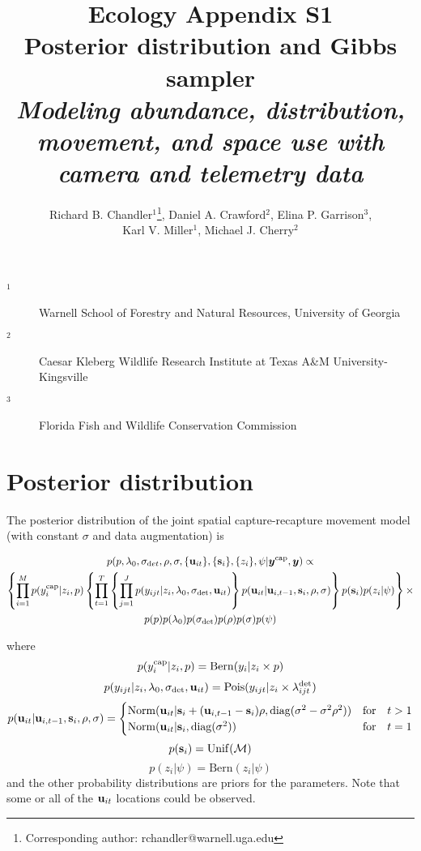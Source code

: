 \documentclass[12pt]{article}
\title{Ecology Appendix S1 \\ Posterior distribution and Gibbs sampler \\ \it Modeling abundance, distribution, movement, and space
  use with camera and telemetry data}
\author{Richard B. Chandler$^1$\footnote{Corresponding author: rchandler@warnell.uga.edu}, Daniel A. Crawford$^2$, Elina P. Garrison$^3$, \\
  Karl V. Miller$^1$, Michael J. Cherry$^2$}
\newcommand{\bs}{{\bf s}}
\newcommand{\bsi}{{\bf s}_i}
\newcommand{\bu}{{\bf u}}
\newcommand{\buit}{{\bf u}_{it}}
\newcommand{\buip}{{\bf u}_{i,t-1}}
\begin{document}
\maketitle

\vspace{12pt}

\begin{description}%
\item[$^1$] Warnell School of Forestry and Natural Resources, University of Georgia %
\item[$^2$] Caesar Kleberg Wildlife Research Institute at Texas A\&M University-Kingsville %
\item[$^3$] Florida Fish and Wildlife Conservation Commission %
\end{description}

\clearpage

\section*{Posterior distribution}

The posterior distribution of the joint spatial capture-recapture
movement model (with constant $\sigma$ and data augmentation) is  

\begin{multline}
  p(p, \lambda_0, \sigma_{\mathrm det}, \rho, \sigma, \{\bu_{it}\}, \{\bs_i\}, \{z_i\}, \psi | {\bm y}^{\rm cap},{\bm y}) \propto \\
  \left\{\prod_{i=1}^M p(y_i^{\rm cap}|z_i, p)
    \left\{\prod_{t=1}^T\left\{\prod_{j=1}^Jp(y_{ijt}|z_i,\lambda_0,\sigma_{\rm det},\buit)
    \right\}p(\buit|\bu_{i,t-1},\bsi,\rho,\sigma)\right\} %
  p(\bsi)p(z_i|\psi)\right\} \times \\
p(p)p(\lambda_0)p(\sigma_{\rm det})p(\rho)p(\sigma)p(\psi) \\
\end{multline}

where
\[
  p(y_i^{\rm cap}|z_i, p) = \mathrm{Bern}(y_i|z_i\times p)
\]
\[
  p(y_{ijt}|z_i,\lambda_0,\sigma_{\rm det},\buit) = \mathrm{Pois}(y_{ijt}|z_i \times \lambda^{\rm det}_{ijt})
\]
\[
  p(\buit|\bu_{i,t-1},\bsi,\rho,\sigma) =
  \begin{cases}
    \mathrm{Norm}(\buit|\bsi+(\buip-\bsi)\rho, \mathrm{diag}(\sigma^2
    - \sigma^2\rho^2)) & \mathrm{for}\quad t>1 \\
    \mathrm{Norm}(\buit|\bsi, \mathrm{diag}(\sigma^2)) & \mathrm{for}\quad t=1 \\
  \end {cases}
\]
\[
  p(\bsi) = \mathrm{Unif}(\mathcal M)
\]
\[
  p(z_i|\psi) = \mathrm{Bern}(z_i|\psi)
\]
and the other probability distributions are priors for the
parameters. Note that some or all of the $\buit$ locations could be
observed.  
\end{document}
